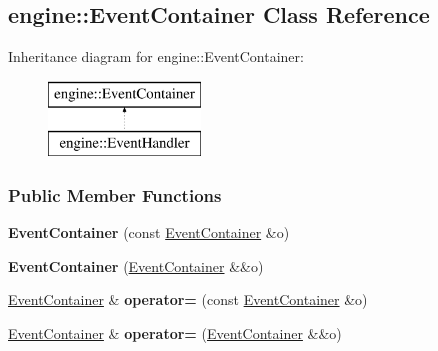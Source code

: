 \hypertarget{a00032}{}\subsection{engine\+:\+:Event\+Container Class Reference}
\label{a00032}
Inheritance diagram for engine\+:\+:Event\+Container\+:\begin{figure}[H]
\begin{center}
\leavevmode
\includegraphics[height=2.000000cm]{a00032}
\end{center}
\end{figure}
\subsubsection*{Public Member Functions}
\begin{DoxyCompactItemize}
\item 
{\bfseries Event\+Container} (const \hyperlink{a00032}{Event\+Container} \&o)\hypertarget{a00032_a589de04f0326a9ea60f46739d11f8bc8}{}\label{a00032_a589de04f0326a9ea60f46739d11f8bc8}

\item 
{\bfseries Event\+Container} (\hyperlink{a00032}{Event\+Container} \&\&o)\hypertarget{a00032_a77b98dd1fd0f7c5ba1e9270964a7e03f}{}\label{a00032_a77b98dd1fd0f7c5ba1e9270964a7e03f}

\item 
\hyperlink{a00032}{Event\+Container} \& {\bfseries operator=} (const \hyperlink{a00032}{Event\+Container} \&o)\hypertarget{a00032_a8fb47de839824ac5cce9b2bbec6a9118}{}\label{a00032_a8fb47de839824ac5cce9b2bbec6a9118}

\item 
\hyperlink{a00032}{Event\+Container} \& {\bfseries operator=} (\hyperlink{a00032}{Event\+Container} \&\&o)\hypertarget{a00032_ad8a227c52cbd142b24adedee6ad2c7c9}{}\label{a00032_ad8a227c52cbd142b24adedee6ad2c7c9}

\end{DoxyCompactItemize}
